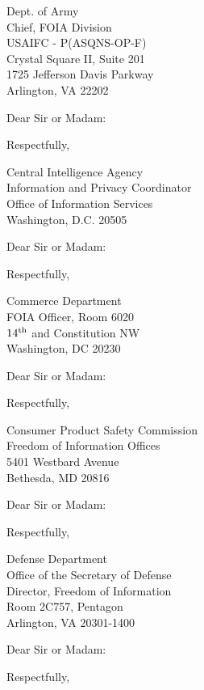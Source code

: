 \documentclass[10pt]{letter}
\begin{document}

\begin{letter}{Dept. of Army \\
               Chief, FOIA Division \\
               USAIFC - P(ASQNS-OP-F) \\
               Crystal Square II, Suite 201 \\
               1725 Jefferson Davis Parkway \\
               Arlington, VA  22202}               
\opening{Dear Sir or Madam:} \body \closing{Respectfully,}
\end{letter}

\begin{letter}{Central Intelligence Agency \\
               Information and Privacy Coordinator \\
               Office of Information Services \\
               Washington, D.C. 20505}               
\opening{Dear Sir or Madam:} \body \closing{Respectfully,}
\end{letter}

\begin{letter}{Commerce Department \\
               FOIA Officer, Room 6020 \\
               $14^{\rm th}$ and Constitution NW \\
               Washington, DC  20230}               
\opening{Dear Sir or Madam:} \body \closing{Respectfully,}
\end{letter}

\begin{letter}{Consumer Product Safety Commission \\
               Freedom of Information Offices \\
               5401 Westbard Avenue \\
               Bethesda, MD 20816}               
\opening{Dear Sir or Madam:} \body \closing{Respectfully,}
\end{letter}

\begin{letter}{Defense Department \\
               Office of the Secretary of Defense \\
               Director, Freedom of Information \\
               Room 2C757, Pentagon \\
               Arlington, VA 20301-1400}               
\opening{Dear Sir or Madam:} \body \closing{Respectfully,} 
\end{letter}
\end{document}
